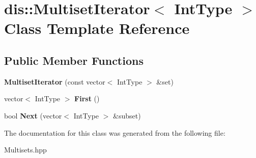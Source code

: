 \hypertarget{classdis_1_1_multiset_iterator}{\section{dis\-:\-:Multiset\-Iterator$<$ Int\-Type $>$ Class Template Reference}
\label{classdis_1_1_multiset_iterator}
}
\subsection*{Public Member Functions}
\begin{DoxyCompactItemize}
\item 
\hypertarget{classdis_1_1_multiset_iterator_aae7e348f36ef9bd75be0c88315a85490}{{\bfseries Multiset\-Iterator} (const vector$<$ Int\-Type $>$ \&set)}\label{classdis_1_1_multiset_iterator_aae7e348f36ef9bd75be0c88315a85490}

\item 
\hypertarget{classdis_1_1_multiset_iterator_a10d9583a0ad7dc456cf0d5f16096a89e}{vector$<$ Int\-Type $>$ {\bfseries First} ()}\label{classdis_1_1_multiset_iterator_a10d9583a0ad7dc456cf0d5f16096a89e}

\item 
\hypertarget{classdis_1_1_multiset_iterator_aa6190b3d74363d4f76b801162751c05d}{bool {\bfseries Next} (vector$<$ Int\-Type $>$ \&subset)}\label{classdis_1_1_multiset_iterator_aa6190b3d74363d4f76b801162751c05d}

\end{DoxyCompactItemize}


The documentation for this class was generated from the following file\-:\begin{DoxyCompactItemize}
\item 
Multisets.\-hpp\end{DoxyCompactItemize}

